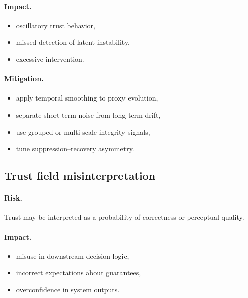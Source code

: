 \documentclass[11pt,letterpaper]{article}
\theoremstyle{gcresult}
\theoremstyle{definition}
\begin{document}
\paragraph{Impact.}
\begin{itemize}[leftmargin=1.5em]
    \item oscillatory trust behavior,
    \item missed detection of latent instability,
    \item excessive intervention.
\end{itemize}

\paragraph{Mitigation.}
\begin{itemize}[leftmargin=1.5em]
    \item apply temporal smoothing to proxy evolution,
    \item separate short-term noise from long-term drift,
    \item use grouped or multi-scale integrity signals,
    \item tune suppression–recovery asymmetry.
\end{itemize}


\subsection{Trust field misinterpretation}

\paragraph{Risk.}
Trust may be interpreted as a probability of correctness or perceptual quality.

\paragraph{Impact.}
\begin{itemize}[leftmargin=1.5em]
    \item misuse in downstream decision logic,
    \item incorrect expectations about guarantees,
    \item overconfidence in system outputs.
\end{itemize}
\end{document}
